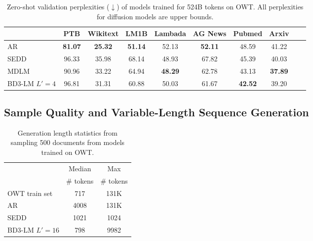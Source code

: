 \documentclass{article} %
\def\algo{BD3-LM}
\def\owt{OWT}
\begin{document}
\begin{table}[ht]
\small
\caption{Zero-shot validation perplexities ($\downarrow$) of models trained for 524B tokens on \owt{}.
All perplexities for diffusion models are upper bounds.
}
\small
\label{zeroshot-ppl}
\centering
\begin{tabular}{lccccccccc}
\toprule
& PTB & Wikitext & LM1B & Lambada  & AG News & Pubmed & Arxiv\\
\midrule
AR &\textbf{81.07}& \textbf{25.32}& \textbf{51.14} & 52.13 & \textbf{52.11} & 48.59 & 41.22\\
\midrule
SEDD  & 96.33 & 35.98 & 68.14& 48.93 & 67.82 & 45.39 & 40.03\\
MDLM  &90.96& 33.22& 64.94& \textbf{48.29} & 62.78 & 43.13 & \textbf{37.89}\\
\algo{} $L'=4$ & 96.81 & 31.31 & 60.88 & 50.03 & 61.67 & \textbf{42.52} & 39.20\\

\bottomrule
\end{tabular}
\end{table}

\subsection{Sample Quality and Variable-Length Sequence Generation}\label{subsec:samples}

\begin{table}
    \small
    \vspace{-10pt}
  \caption{Generation length statistics from sampling 500 documents from models trained on OWT.}
  \label{tab:owt-gen-lens}
  \centering
    \setlength{\tabcolsep}{2pt} %

  \begin{tabular}{lcc}
  
    \toprule
    & Median  & Max \\
    & \# tokens  & \# tokens \\

    \midrule
    OWT train set  & 717 & 131K\\
    AR  & 4008 & 131K \\
    \midrule
    SEDD & 1021 & 1024 \\
    \algo{} $L'=16$ & 798 & 9982\\
    \bottomrule
  \end{tabular}
  \vspace{-5pt}
\end{table}
\end{document}
